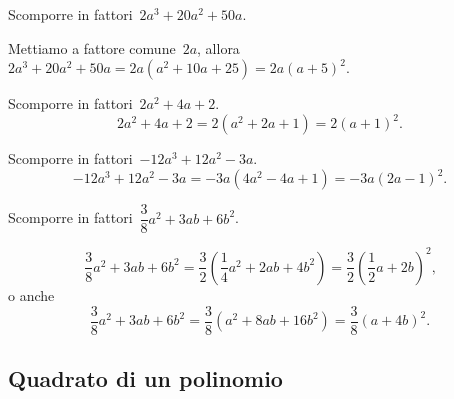\begin{exrig}
 \begin{esempio}
Scomporre in fattori~$2a^{3}+20a^{2}+50a$.

Mettiamo a fattore comune~$2a$, allora~$2a^{3}+20a^{2}+50a=2a(a^{2}+10a+25)=2a(a+5)^{2}$.
 \end{esempio}

 \begin{esempio}
Scomporre in fattori~$2a^{2}+4a+2$.
\[2a^{2}+4a+2=2\left(a^{2}+2a+1\right)=2(a+1)^{2}.\]
 \end{esempio}

 \begin{esempio}
Scomporre in fattori~$-12a^{3}+12a^{2}-3a$.
\[-12a^{3}+12a^{2}-3a=-3a\left(4a^{2}-4a+1\right)=-3a(2a-1)^{2}.\]
 \end{esempio}

 \begin{esempio}
Scomporre in fattori~$\dfrac{3}{8}a^{2}+3ab+6b^{2}$.

\[\frac{3}{8}a^{2}+3ab+6b^{2}=\frac{3}{2}\left(\frac{1}{4}a^{2}+2ab+4b^{2}\right)=\frac{3}{2}\left(\frac{1}{2}a+2b\right)^{2}\text{,}\]
o anche
\[\frac{3}{8}a^{2}+3ab+6b^{2}=\frac{3}{8}\left(a^{2}+8ab+16b^{2} \right)=\frac{3}{8}\left(a+4b\right)^{2}.\]
 \end{esempio}
\end{exrig}
\ovalbox{\risolvii \ref{ese:13.23}, \ref{ese:13.24}, \ref{ese:13.25}, \ref{ese:13.26}, \ref{ese:13.27}, \ref{ese:13.28}, \ref{ese:13.29}, \ref{ese:13.30}, \ref{ese:13.31}, \ref{ese:13.32}}

\subsection{Quadrato di un polinomio}

